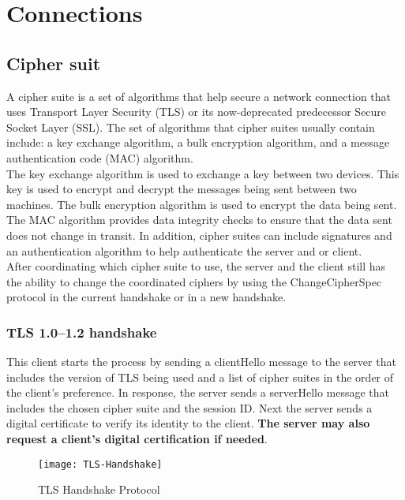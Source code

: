\chapter{Connections}

\section{Cipher suit}
A cipher suite is a set of algorithms that help secure a network connection that uses Transport Layer Security (TLS) or its now-deprecated predecessor Secure Socket Layer (SSL). The set of algorithms that cipher suites usually contain include: a key exchange algorithm, a bulk encryption algorithm, and a message authentication code (MAC) algorithm.\cite{ciphersuit-wiki}
\\
The key exchange algorithm is used to exchange a key between two devices. This key is used to encrypt and decrypt the messages being sent between two machines. The bulk encryption algorithm is used to encrypt the data being sent. The MAC algorithm provides data integrity checks to ensure that the data sent does not change in transit. In addition, cipher suites can include signatures and an authentication algorithm to help authenticate the server and or client.\cite{ciphersuit-wiki}
\\
After coordinating which cipher suite to use, the server and the client still has the ability to change the coordinated ciphers by using the ChangeCipherSpec protocol in the current handshake or in a new handshake.\cite{ciphersuit-wiki}


\subsection{TLS 1.0–1.2 handshake}

This client starts the process by sending a clientHello message to the server that includes the version of TLS being used and a list of cipher suites in the order of the client’s preference. In response, the server sends a serverHello message that includes the chosen cipher suite and the session ID. Next the server sends a digital certificate to verify its identity to the client. \textbf{The server may also request a client’s digital certification if needed}.\cite{ciphersuit-wiki}

\begin{figure}[!h]
\centering\texttt{[image: TLS-Handshake]}
\caption{TLS Handshake Protocol \cite{TLS-meduim}}
\label{fig:TLS_Proto} %
\end{figure}


